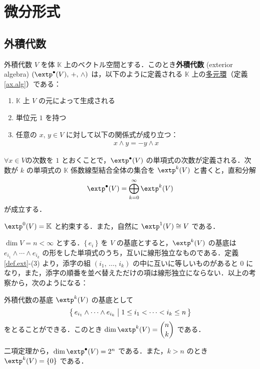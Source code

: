 \documentclass[geometry_main]{subfiles}
\begin{document}
\setcounter{chapter}{3}

\chapter{微分形式}
\label{chap4}

\section{外積代数}

\begin{mydef}[label=def.ext]{外積代数}
$V$ を体 $\mathbb{K}$ 上のベクトル空間とする．このとき\textbf{外積代数} (exterior algebra) $\left( \extp^\bullet (V),\, +,\, \wedge \right)$ は，以下のように定義される $\mathbb{K}$ 上の\hyperref[ax.alg]{多元環}（定義\ref{ax.alg}）である：
	\begin{enumerate}
		\item $\mathbb{K}$ 上 $V$ の元によって生成される
		\item 単位元 $1$ を持つ
		\item 任意の $x,\, y \in V$ に対して以下の関係式が成り立つ：
		\begin{align}
			x \wedge y = - y \wedge x
		\end{align}
	\end{enumerate}
\end{mydef}

$\forall x \in V$の次数を $1$ とおくことで，$\extp^\bullet (V)$ の単項式の次数が定義される．次数が $k$ の単項式の $\mathbb{K}$ 係数線型結合全体の集合を $\extp^k (V)$ と書くと，直和分解
\begin{align}
	\extp^\bullet (V) = \bigoplus_{k=0}^\infty \extp^k (V)
\end{align}
が成立する．

\begin{marker} 
	$\extp^0(V) = \mathbb{K}$ と約束する．また，自然に $\extp^1(V) \cong V$ である．
\end{marker}


$\dim V = n < \infty$ とする．$\{\, e_i \, \}$ を $V$ の基底とすると，$\extp^k (V)$ の基底は $e_{i_1} \wedge \cdots \wedge e_{i_k}$ の形をした単項式のうち，互いに線形独立なものである．定義\ref{def.ext}-(3) より，添字の組 $(i_1,\, \dots ,\, i_k)$ の中に互いに等しいものがあると $0$ になり，また，添字の順番を並べ替えただけの項は線形独立にならない．以上の考察から，次のようになる：

\begin{mydef}[label=basisforext]{外積代数の基底}
	$\extp^k (V)$ の基底として
	\begin{align}
		\bigl\{\, e_{i_1} \wedge \cdots \wedge e_{i_k} \bigm| 1 \le i_1 < \cdots < i_k \le n \, \bigr\}
	\end{align}
	をとることができる．このとき $\displaystyle \dim \extp^k (V) = \binom{n}{k}$ である．	
\end{mydef}
二項定理から，$\dim \extp^\bullet (V) = 2^n$ である．また，$k > n$ のとき $\extp^k (V) = \{ 0 \}$ である．
\end{document}
